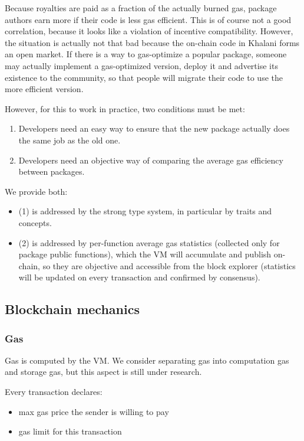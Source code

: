 \documentclass[a4paper]{article}
\begin{document}
Because royalties are paid as a fraction of the actually burned gas, package authors earn more if their code is less gas efficient. This is of course not a good correlation, because it looks like a violation of incentive compatibility. However, the situation is actually not that bad because the on-chain code in Khalani forms an open market. If there is a way to gas-optimize a popular package, someone may actually implement a gas-optimized version, deploy it and advertise its existence to the community, so that people will migrate their code to use the more efficient version.

However, for this to work in practice, two conditions must be met:

\begin{enumerate}
  \item Developers need an easy way to ensure that the new package actually does the same job as the old one.
  \item Developers need an objective way of comparing the average gas efficiency between packages.
\end{enumerate}

We provide both:

\begin{itemize}
  \item (1) is addressed by the strong type system, in particular by traits and concepts.
  \item (2) is addressed by per-function average gas statistics (collected only for package public functions), which the VM will accumulate and publish on-chain, so they are objective and accessible from the block explorer (statistics will be updated on every transaction and confirmed by consensus).
\end{itemize}

\subsection{Blockchain mechanics}

\subsubsection{Gas}

Gas is computed by the VM. We consider separating gas into computation gas and storage gas, but this aspect is still under research.

Every transaction declares:

\begin{itemize}
  \item max gas price the sender is willing to pay
  \item gas limit for this transaction
\end{itemize}
\end{document}
